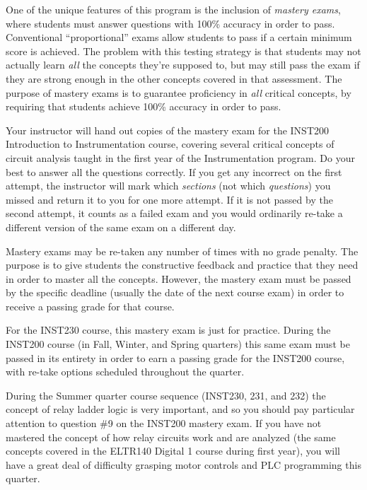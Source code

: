 

One of the unique features of this program is the inclusion of {\it mastery exams}, where students must answer questions with 100\% accuracy in order to pass.  Conventional ``proportional'' exams allow students to pass if a certain minimum score is achieved.  The problem with this testing strategy is that students may not actually learn {\it all} the concepts they're supposed to, but may still pass the exam if they are strong enough in the other concepts covered in that assessment.  The purpose of mastery exams is to guarantee proficiency in {\it all} critical concepts, by requiring that students achieve 100\% accuracy in order to pass.

\vskip 10pt

Your instructor will hand out copies of the mastery exam for the INST200 Introduction to Instrumentation course, covering several critical concepts of circuit analysis taught in the first year of the Instrumentation program.  Do your best to answer all the questions correctly.  If you get any incorrect on the first attempt, the instructor will mark which {\it sections} (not which {\it questions}) you missed and return it to you for one more attempt.  If it is not passed by the second attempt, it counts as a failed exam and you would ordinarily re-take a different version of the same exam on a different day.

\vskip 10pt

Mastery exams may be re-taken any number of times with no grade penalty.  The purpose is to give students the constructive feedback and practice that they need in order to master all the concepts.  However, the mastery exam must be passed by the specific deadline (usually the date of the next course exam) in order to receive a passing grade for that course.

\vskip 10pt

For the INST230 course, this mastery exam is just for practice.  During the INST200 course (in Fall, Winter, and Spring quarters) this same exam must be passed in its entirety in order to earn a passing grade for the INST200 course, with re-take options scheduled throughout the quarter.  

\vskip 10pt

During the Summer quarter course sequence (INST230, 231, and 232) the concept of relay ladder logic is very important, and so you should pay particular attention to question \#9 on the INST200 mastery exam.  If you have not mastered the concept of how relay circuits work and are analyzed (the same concepts covered in the ELTR140 Digital 1 course during first year), you will have a great deal of difficulty grasping motor controls and PLC programming this quarter.

